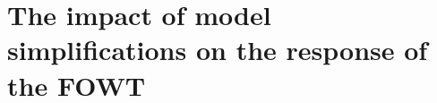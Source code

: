 \section{The impact of model simplifications on the response of the FOWT} \label{sec:impact_simplifications}